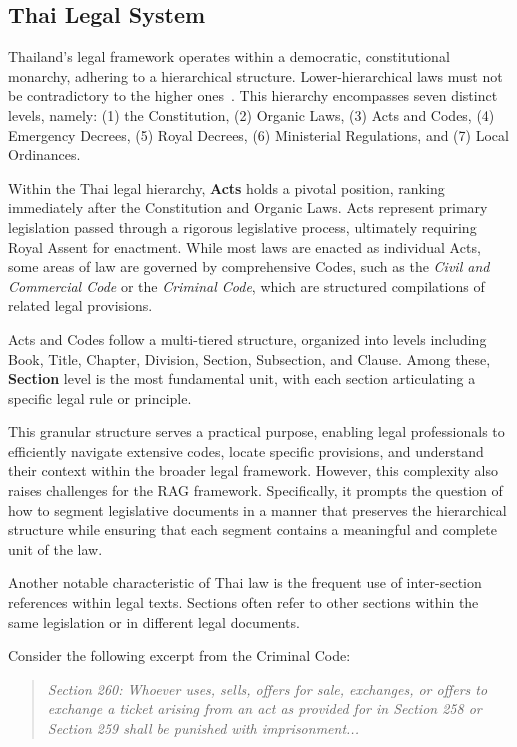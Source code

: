 \subsection{Thai Legal System}
\label{subsec: thai_legal}

Thailand's legal framework operates within a democratic, constitutional monarchy, adhering to a hierarchical structure. 
%
Lower-hierarchical laws must not be contradictory to the higher ones~\cite{chuathai2023introduction}. 
%
This hierarchy encompasses seven distinct levels, namely: (1) the Constitution, (2) Organic Laws, (3) Acts and Codes, (4) Emergency Decrees, (5) Royal Decrees, (6) Ministerial Regulations, and (7) Local Ordinances.

Within the Thai legal hierarchy, \textbf{Acts} holds a pivotal position, ranking immediately after the Constitution and Organic Laws. 
%
Acts represent primary legislation passed through a rigorous legislative process, ultimately requiring Royal Assent for enactment. 
%
While most laws are enacted as individual Acts, some areas of law are governed by comprehensive Codes, such as the \textit{Civil and Commercial Code} or the \textit{Criminal Code}, which are structured compilations of related legal provisions.

Acts and Codes follow a multi-tiered structure, organized into levels including Book, Title, Chapter, Division, Section, Subsection, and Clause. 
%
Among these, \textbf{Section} level is the most fundamental unit, with each section articulating a specific legal rule or principle.

This granular structure serves a practical purpose, enabling legal professionals to efficiently navigate extensive codes, locate specific provisions, and understand their context within the broader legal framework. 
%
However, this complexity also raises challenges for the RAG framework. 
%
Specifically, it prompts the question of how to segment legislative documents in a manner that preserves the hierarchical structure while ensuring that each segment contains a meaningful and complete unit of the law.

Another notable characteristic of Thai law is the frequent use of inter-section references within legal texts. 
%
Sections often refer to other sections within the same legislation or in different legal documents.

Consider the following excerpt from the Criminal Code:
\begin{quote}
    \textit{Section 260: Whoever uses, sells, offers for sale, exchanges, or offers to exchange a ticket arising from an act as provided for in Section 258 or Section 259 shall be punished with imprisonment...}%
    \label{quote: inter_ref}
\end{quote}


